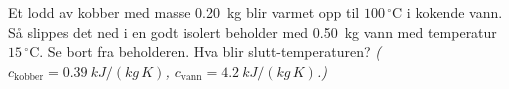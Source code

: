 %
Et lodd av kobber med masse \SI{0.20}{\kilo\gram} blir varmet opp til $100\,^\circ$C i kokende vann. Så slippes det ned i en godt isolert beholder med \SI{0.50}{\kilo\gram} vann med temperatur $15\,^\circ$C. Se bort fra beholderen. Hva blir slutt-temperaturen?
\textit{($c_\text{kobber} = \SI{0.39}{kJ/(kg\,K)}$, $c_\text{vann} = \SI{4.2}{kJ/(kg\,K)}$.)}
%
